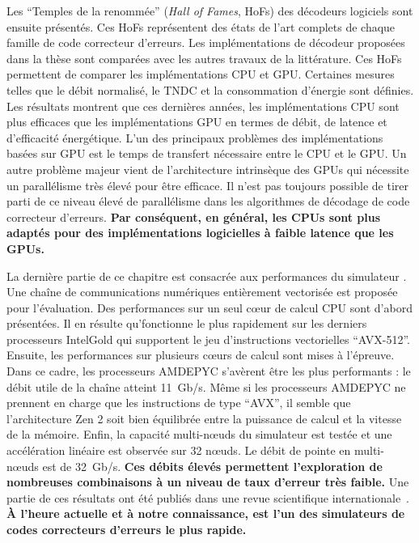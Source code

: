 Les ``Temples de la renommée'' (\emph{Hall of Fames}, HoFs) des décodeurs
logiciels sont ensuite présentés. Ces HoFs représentent des états de l'art
complets de chaque famille de code correcteur d'erreurs. Les implémentations de
décodeur proposées dans la thèse sont comparées avec les autres travaux de la
littérature. Ces HoFs permettent de comparer les implémentations CPU et GPU.
Certaines mesures telles que le débit normalisé, le TNDC et la consommation
d'énergie sont définies. Les résultats montrent que ces dernières années, les
implémentations CPU sont plus efficaces que les implémentations GPU en termes de
débit, de latence et d'efficacité énergétique. L'un des principaux problèmes des
implémentations basées sur GPU est le temps de transfert nécessaire entre le
CPU et le GPU. Un autre problème majeur vient de l'architecture intrinsèque des
GPUs qui nécessite un parallélisme très élevé pour être efficace. Il n'est pas
toujours possible de tirer parti de ce niveau élevé de parallélisme dans les
algorithmes de décodage de code correcteur d'erreurs. \textbf{Par conséquent, en
général, les CPUs sont plus adaptés pour des implémentations logicielles à
faible latence que les GPUs.}

La dernière partie de ce chapitre est consacrée aux performances du simulateur
\AFFECT. Une chaîne de communications numériques entièrement vectorisée est
proposée pour l'évaluation. Des performances sur un seul cœur de calcul CPU sont
d'abord présentées. Il en résulte qu'\AFFECT fonctionne le plus rapidement sur
les derniers processeurs Intel\R Gold qui supportent le jeu d'instructions
vectorielles ``AVX-512''. Ensuite, les performances sur plusieurs cœurs de
calcul sont mises à l'épreuve. Dans ce cadre, les processeurs AMD\R EPYC
s'avèrent être les plus performants : le débit utile de la chaîne atteint
11~Gb/s. Même si les processeurs AMD\R EPYC ne prennent en charge que les
instructions de type ``AVX'', il semble que l'architecture Zen 2 soit bien
équilibrée entre la puissance de calcul et la vitesse de la mémoire. Enfin, la
capacité multi-nœuds du simulateur \AFFECT est testée et une accélération
linéaire est observée sur 32 nœuds. Le débit de pointe en multi-nœuds est de
32~Gb/s. \textbf{Ces débits élevés permettent l'exploration de nombreuses
combinaisons à un niveau de taux d'erreur très faible.} Une partie de ces
résultats ont été publiés dans une revue scientifique
internationale~\cite{Cassagne2019a}. \textbf{À l'heure actuelle et à notre
connaissance, \AFFECT est l'un des simulateurs de codes correcteurs d'erreurs le
plus rapide.}

